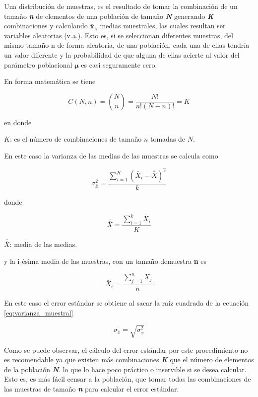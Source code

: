 \documentclass[
  oneside]{book}
\begin{document}
Una distribución de muestras, es el resultado de tomar la combinación de un tamaño \textbf{\emph{n}} de elementos de una población de tamaño \textbf{\emph{N}} generando \textbf{\emph{K}} combinaciones y calculando \(\boldsymbol{\bar{x}_k}\) medias muestrales, las cuales resultan ser variables aleatorias (v.a.). Esto es, si se seleccionan diferentes muestras, del mismo tamaño n de forma aleatoria, de una población, cada una de ellas tendría un valor diferente y la probabilidad de que alguna de ellas acierte al valor del parámetro poblacional \(\boldsymbol{\mu}\) es casi seguramente cero.

En forma matemática se tiene

\begin{equation}
C(N,n)=\binom{N}{n}=\frac{N!}{n!(N-n)!}=K
\label{eq:combinaciones}
\end{equation}

en donde

\(K\): es el número de combinaciones de tamaño \(n\) tomadas de \(N\).

En este caso la varianza de las medias de las muestras se calcula como

\begin{equation}
\sigma^2_{\bar{x}}=\frac{\sum_{i=1}^K(\bar{X}_i-\bar{\bar{X}})^2}{k}
\label{eq:varianza_muestral}
\end{equation}

donde

\begin{equation}
\bar{\bar{X}}=\frac{\sum_{i=1}^k\bar{X}_i}{K}
\label{eq:media_medias}
\end{equation}

\(\bar{\bar{X}}\): media de las medias.

y la i-ésima media de las muestras, con un tamaño demuestra \textbf{n} es

\begin{equation}
\bar{X}_i=\frac{\sum_{j=1}^nX_j}{n}
\label{eq:media_mues}
\end{equation}

En este caso el error estándar se obtiene al sacar la raíz cuadrada de la ecuación \eqref{eq:varianza_muestral}

\begin{equation}
\sigma_{\bar{x}}=\sqrt{\sigma^2_{\bar{x}}}
\label{eq:err_est}
\end{equation}

Como se puede observar, el cálculo del error estándar por este procedimiento no es recomendable ya que existen más combinaciones \textbf{\emph{K}} que el número de elementos de la población \textbf{\emph{N}}. lo que lo hace poco práctico o inservible si se desea calcular. Esto es, es más fácil censar a la población, que tomar todas las combinaciones de las muestras de tamaño \textbf{\emph{n}} para calcular el error estándar.
\end{document}
